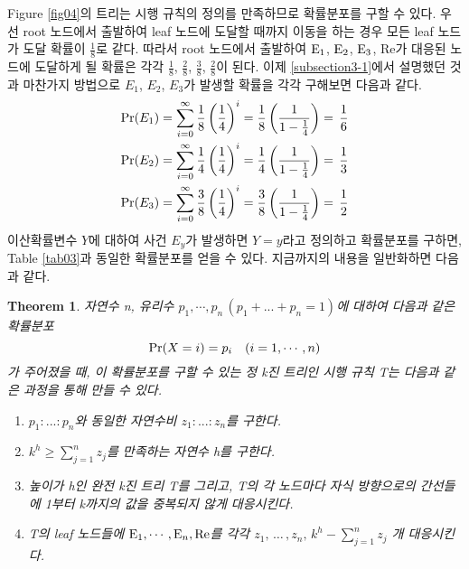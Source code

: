 \documentclass[11pt]{article}
\newtheorem{theorem}{Theorem}
\begin{document}
Figure \ref{fig04}의 트리는 시행 규칙의 정의를 만족하므로 확률분포를 구할 수 있다. 우선 root 노드에서 출발하여 leaf 노드에 도달할 때까지 이동을 하는 경우 모든 leaf 노드가 도달 확률이 $\frac{1}{8}$로 같다. 따라서 root 노드에서 출발하여 $\textnormal{E}_{1}$, $\textnormal{E}_{2}$, $\textnormal{E}_{3}$, Re가 대응된 노드에 도달하게 될 확률은 각각 $\frac{1}{8}$, $\frac{2}{8}$, $\frac{3}{8}$, $\frac{2}{8}$이 된다. 이제 \ref{subsection3-1}에서 설명했던 것과 마찬가지 방법으로 $E_{1}$, $E_{2}$, $E_{3}$가 발생할 확률을 각각 구해보면 다음과 같다.
\[
\begin{split}
\textnormal{Pr}(E_{1}) & = \sum_{i=0}^{\infty} \frac{1}{8}\left(\frac{1}{4}\right)^i = \frac{1}{8}\left(\frac{1}{1 - \frac{1}{4}}\right) = \,\frac{1}{6}\\
\textnormal{Pr}(E_{2}) & = \sum_{i=0}^{\infty} \frac{1}{4}\left(\frac{1}{4}\right)^i = \frac{1}{4}\left(\frac{1}{1 - \frac{1}{4}}\right) = \,\frac{1}{3}\\
\textnormal{Pr}(E_{3}) & = \sum_{i=0}^{\infty} \frac{3}{8}\left(\frac{1}{4}\right)^i = \frac{3}{8}\left(\frac{1}{1 - \frac{1}{4}}\right) = \,\frac{1}{2}
\end{split}
\]
이산확률변수 $Y$에 대하여 사건 $E_{y}$가 발생하면 $Y=y$라고 정의하고 확률분포를 구하면, Table \ref{tab03}과 동일한 확률분포를 얻을 수 있다. 지금까지의 내용을 일반화하면 다음과 같다.\\

\singlespacing
\begin{theorem}
자연수 n, 유리수 $p_{1}, \cdots, p_{n}\,(p_{1}+...+p_{n}=1)$에 대하여 다음과 같은 확률분포
\[\textnormal{Pr}(X = i) = p_{i} \quad(i = 1,\cdots, n)\]
가 주어졌을 때, 이 확률분포를 구할 수 있는 정 k진 트리인 시행 규칙 T는 다음과 같은 과정을 통해 만들 수 있다.
\begin{enumerate}
    \item $p_{1}:...:p_{n}$와 동일한 자연수비 $z_{1}:...:z_{n}$를 구한다.
    \item $k^{h} \ge \displaystyle \sum_{j=1}^{n} z_{j}$를 만족하는 자연수 h를 구한다.
    \item 높이가 h인 완전 k진 트리 T를 그리고, T의 각 노드마다 자식 방향으로의 간선들에 1부터 k까지의 값을 중복되지 않게 대응시킨다.
    \item T의 leaf 노드들에 $\textnormal{E}_1,\cdots,\textnormal{E}_n,\textnormal{Re}$를 각각 $z_{1},\,\dots\,,z_{n},\,k^{h}-\displaystyle \sum_{j=1}^{n}z_{j}$ 개 대응시킨다.
\end{enumerate}
\label{thm02}
\end{theorem}
\doublespacing
\end{document}
